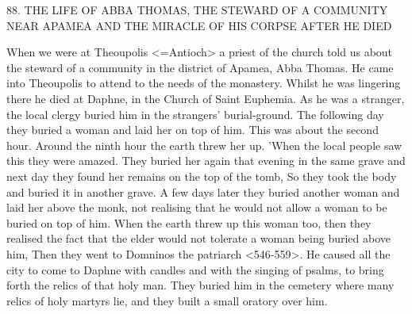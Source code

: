 88.
THE LIFE OF ABBA THOMAS, THE STEWARD OF
A COMMUNITY NEAR APAMEA AND THE MIRACLE
OF HIS CORPSE AFTER HE DIED

When we were at Theoupolis <=Antioch> a priest of the church
told us about the steward of a community in the district of Apamea,
Abba Thomas.
He came into Theoupolis to attend to the needs of
the monastery.
Whilst he was lingering there he died at Daphne, in
the Church of Saint Euphemia.
As he was a stranger, the local
clergy buried him in the strangers' burial-ground.
The following day
they buried a woman and laid her on top of him.
This was about
the second hour.
Around the ninth hour the earth threw her up.
'When the local people saw this they were amazed.
They buried her
again that evening in the same grave and next day they found her
remains on the top of the tomb, So they took the body and buried
it in another grave.
A few days later they buried another woman
and laid her above the monk, not realising that he would not allow
a woman to be buried on top of him.
When the earth threw up this
woman too, then they realised the fact that the elder would not
tolerate a woman being buried above him, Then they went to
Domninos the patriarch <546-559>.
He caused all the city to come
to Daphne with candles and with the singing of psalms, to bring
forth the relics of that holy man.
They buried him in the cemetery
where many relics of holy martyrs lie, and they built a small oratory
over him.


